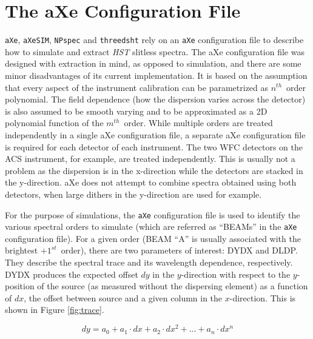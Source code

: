 \documentclass[preprint]{aastex}
\begin{document}
\newpage

\appendix

\section{The aXe Configuration File}\label{sec:axeconf}
\texttt{aXe}, \texttt{aXeSIM}, \texttt{NPspec} and \texttt{threedsht} rely on an \texttt{aXe} configuration file to describe how to simulate and extract \textit{HST} slitless spectra. The aXe configuration file was designed with extraction in mind, as opposed to simulation, and there are some minor disadvantages of its current implementation. It is based on the assumption that every aspect of the instrument calibration can be parametrized as $n^{th}$\ order polynomial. The field dependence (how the dispersion varies across the detector) is also assumed to be smooth varying and to be approximated as a 2D polynomial function of the $m^{th}$\ order. While multiple orders are treated independently in a single aXe configuration file, a separate aXe configuration file is required for each detector of each instrument. The two WFC detectors on the ACS instrument, for example, are treated independently. This is usually not a problem as the dispersion is in the x-direction while the detectors are stacked in the y-direction. aXe does not attempt to combine spectra obtained using both detectors, when large dithers in the y-direction are used for example.



For the purpose of simulations, the \texttt{aXe} configuration file is used to identify the various spectral orders to simulate (which are referred as ``BEAMs'' in the \texttt{aXe} configuration file). For a given order (BEAM ``A'' is usually associated with the brightest $+1^{st}$\ order), there are two parameters of interest: DYDX and DLDP. They describe the spectral trace and its wavelength dependence, respectively. DYDX produces the expected offset $dy$ in the $y$-direction with respect to the $y$-position of the source (as measured without the dispersing element) as a function of $dx$, the offset between source and a given column in the $x$-direction. This is shown in Figure \ref{fig:trace}.

\begin{dmath}
dy = a_0 + a_1 \cdot dx + a_2 \cdot dx^2 + ... + a_n \cdot dx^n \label{eq:1}
\end{dmath}
\end{document}

